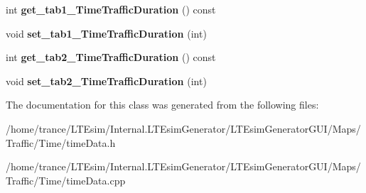 \begin{DoxyCompactItemize}
\item 
int {\bfseries get\+\_\+tab1\+\_\+\+Time\+Traffic\+Duration} () const \hypertarget{class_time_data_aad9f5cf629ad5ae9f98bec3604c053a9}{}\label{class_time_data_aad9f5cf629ad5ae9f98bec3604c053a9}

\item 
void {\bfseries set\+\_\+tab1\+\_\+\+Time\+Traffic\+Duration} (int)\hypertarget{class_time_data_a6f7cc33a538185a97bb0f1b9bef5f2ab}{}\label{class_time_data_a6f7cc33a538185a97bb0f1b9bef5f2ab}

\item 
int {\bfseries get\+\_\+tab2\+\_\+\+Time\+Traffic\+Duration} () const \hypertarget{class_time_data_ae2b7f666013892e4f0909d0e021bb931}{}\label{class_time_data_ae2b7f666013892e4f0909d0e021bb931}

\item 
void {\bfseries set\+\_\+tab2\+\_\+\+Time\+Traffic\+Duration} (int)\hypertarget{class_time_data_aa39254c908e58ea1d61236d29c682f4c}{}\label{class_time_data_aa39254c908e58ea1d61236d29c682f4c}

\end{DoxyCompactItemize}


The documentation for this class was generated from the following files\+:\begin{DoxyCompactItemize}
\item 
/home/trance/\+L\+T\+Esim/\+Internal.\+L\+T\+Esim\+Generator/\+L\+T\+Esim\+Generator\+G\+U\+I/\+Maps/\+Traffic/\+Time/time\+Data.\+h\item 
/home/trance/\+L\+T\+Esim/\+Internal.\+L\+T\+Esim\+Generator/\+L\+T\+Esim\+Generator\+G\+U\+I/\+Maps/\+Traffic/\+Time/time\+Data.\+cpp\end{DoxyCompactItemize}
